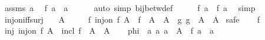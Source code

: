 \begin{isabellebody}
\ assms\ a{\isacharprime}{\kern0pt}\ \isamarkupfalse%
\ {\isachardoublequoteopen}f\ a\ {\isacharequal}{\kern0pt}\ a{\isacharprime}{\kern0pt}{\isachardoublequoteclose}\isanewline
\ \ \ \ \isamarkupfalse%
\ {\isacharparenleft}{\kern0pt}auto\ simp{\isacharcolon}{\kern0pt}\ bij{\isacharunderscore}{\kern0pt}betw{\isacharunderscore}{\kern0pt}def{\isacharparenright}{\kern0pt}\isanewline
\ \ \isamarkupfalse%
\ \isamarkupfalse%
\ {\isachardoublequoteopen}{\isacharquery}{\kern0pt}f{\isacharprime}{\kern0pt}{\isacharprime}{\kern0pt}\ a\ {\isacharequal}{\kern0pt}\ f\ a{\isachardoublequoteclose}\ \isamarkupfalse%
\ simp\isanewline
{}\isamarkupfalse%
%
\endisatagproof
{\isafoldproof}%
%
\isadelimproof
\isanewline
%
\endisadelimproof
\isanewline
{}\isamarkupfalse%
\ inj{\isacharunderscore}{\kern0pt}on{\isacharunderscore}{\kern0pt}iff{\isacharunderscore}{\kern0pt}surj{\isacharcolon}{\kern0pt}\isanewline
\ \ \ {\isachardoublequoteopen}A\ {\isasymnoteq}\ {\isacharbraceleft}{\kern0pt}{\isacharbraceright}{\kern0pt}{\isachardoublequoteclose}\isanewline
\ \ \ {\isachardoublequoteopen}{\isacharparenleft}{\kern0pt}{\isasymexists}f{\isachardot}{\kern0pt}\ inj{\isacharunderscore}{\kern0pt}on\ f\ A\ {\isasymand}\ f\ {\isacharbackquote}{\kern0pt}\ A\ {\isasymsubseteq}\ A{\isacharprime}{\kern0pt}{\isacharparenright}{\kern0pt}\ {\isasymlongleftrightarrow}\ {\isacharparenleft}{\kern0pt}{\isasymexists}g{\isachardot}{\kern0pt}\ g\ {\isacharbackquote}{\kern0pt}\ A{\isacharprime}{\kern0pt}\ {\isacharequal}{\kern0pt}\ A{\isacharparenright}{\kern0pt}{\isachardoublequoteclose}\isanewline
%
\isadelimproof
%
\endisadelimproof
%
\isatagproof
{}\isamarkupfalse%
\ safe\isanewline
\ \ \isamarkupfalse%
\ f\isanewline
\ \ \isamarkupfalse%
\ inj{\isacharcolon}{\kern0pt}\ {\isachardoublequoteopen}inj{\isacharunderscore}{\kern0pt}on\ f\ A{\isachardoublequoteclose}\ \ incl{\isacharcolon}{\kern0pt}\ {\isachardoublequoteopen}f\ {\isacharbackquote}{\kern0pt}\ A\ {\isasymsubseteq}\ A{\isacharprime}{\kern0pt}{\isachardoublequoteclose}\isanewline
\ \ \isamarkupfalse%
\ {\isacharquery}{\kern0pt}phi\ {\isacharequal}{\kern0pt}\ {\isachardoublequoteopen}{\isasymlambda}a{\isacharprime}{\kern0pt}\ a{\isachardot}{\kern0pt}\ a\ {\isasymin}\ A\ {\isasymand}\ f\ a\ {\isacharequal}{\kern0pt}\ a{\isacharprime}{\kern0pt}{\isachardoublequoteclose}\isanewline
\ \ \isamarkupfalse%

\end{isabellebody}
